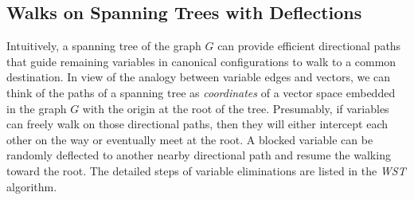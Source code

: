 \documentclass[11pt]{article}
\begin{document}
\subsection{Walks on Spanning Trees with Deflections}
Intuitively, a spanning tree of the graph $G$ can provide efficient directional paths that guide remaining variables in canonical configurations to walk to a common destination. In view of the analogy between variable edges and vectors, we can think of the paths of a spanning tree as {\it coordinates} of a vector space embedded in the graph $G$ with the origin at the root of the tree. Presumably, if variables can freely walk on those directional paths, then they will either intercept each other on the way or eventually meet at the root. A blocked variable can be randomly deflected to another nearby directional path and resume the walking toward the root. The detailed steps of variable eliminations are listed in the {\it WST} algorithm.
\end{document}
